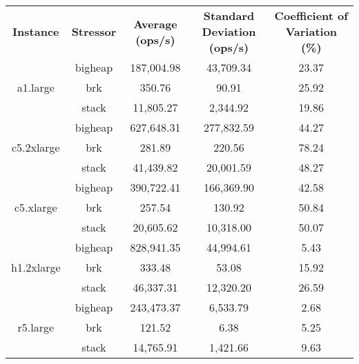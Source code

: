 \documentclass[11pt]{article}
\begin{document}
		\begin{minipage}{\linewidth}
		\begin{center}
			 \label{tab:memory_tests_summary_results}	
			\begin{tabular}{|*{5}{c|}}
				\hline
				\multirow{3}{2cm}{\textbf{Instance}} & \multirow{3}{2cm}{\textbf{Stressor}} & \multirow{3}{2cm}{\textbf{Average (ops/s)}} & \multirow{3}{2cm}{\textbf{Standard Deviation (ops/s)}} & \multirow{3}{2.5cm}{\textbf{Coefficient of Variation (\%)}} \\
				 &  &  &  & \\
				 &  &  &  & \\
				\hline
				\multirow{3}{2cm}{a1.large} & bigheap & 187,004.98 & 43,709.34 & 23.37 \\\cline{2-5}
				& brk & 350.76 & 90.91 & 25.92 \\\cline{2-5}
				& stack & 11,805.27 & 2,344.92 & 19.86 \\
				\hline
				\multirow{3}{2cm}{c5.2xlarge} & bigheap & 627,648.31 & 277,832.59 & 44.27 \\\cline{2-5}
				& brk & 281.89 & 220.56 & 78.24 \\\cline{2-5}
				& stack & 41,439.82 & 20,001.59 & 48.27 \\
				\hline
				\multirow{3}{2cm}{c5.xlarge} & bigheap & 390,722.41 & 166,369.90 & 42.58 \\\cline{2-5}
				& brk & 257.54 & 130.92 & 50.84 \\\cline{2-5}
				& stack & 20,605.62 & 10,318.00 & 50.07 \\
				\hline
				\multirow{3}{2cm}{h1.2xlarge} & bigheap & 828,941.35 & 44,994.61 & 5.43 \\\cline{2-5}
				& brk & 333.48 & 53.08 & 15.92 \\\cline{2-5}
				& stack & 46,337.31 & 12,320.20 & 26.59 \\
				\hline
				\multirow{3}{2cm}{r5.large} & bigheap & 243,473.37 & 6,533.79 & 2.68 \\\cline{2-5}
				& brk & 121.52 & 6.38 & 5.25 \\\cline{2-5}
				& stack & 14,765.91 & 1,421.66 & 9.63 \\
				\hline
			\end{tabular}
		\end{center}
		\end{minipage}
		
\end{document}
